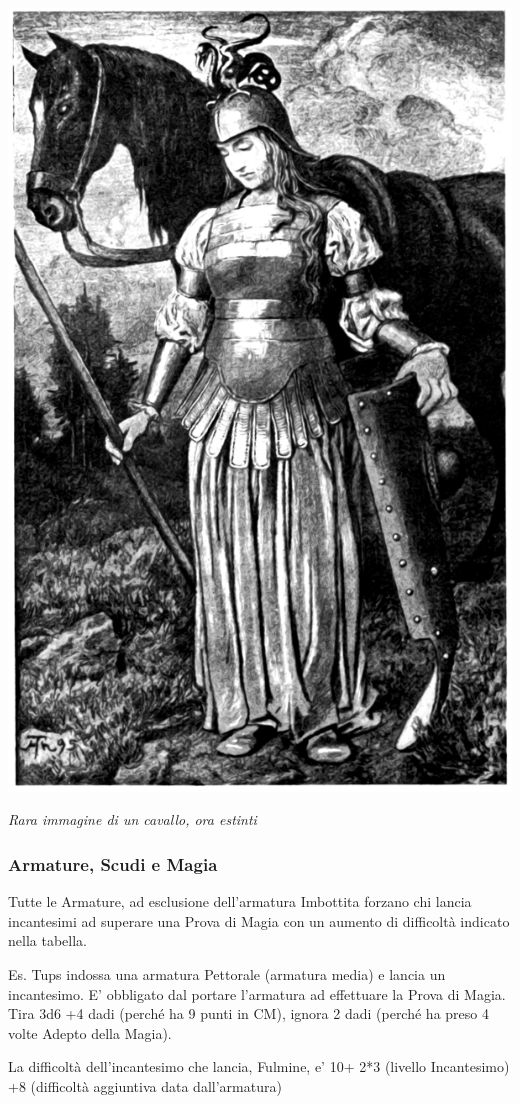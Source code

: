 \begin{multicols}{2}
\begin{center}
	\includegraphics[width=0.75\linewidth]{immagini/donnacavalierecavallo.png}

	\emph{Rara immagine di un cavallo, ora estinti}
\end{center}

\subsubsection{Armature, Scudi e Magia}\hypertarget{armatureemagie}{}\label{armatureemagie}

Tutte le Armature, ad esclusione dell'armatura Imbottita forzano chi lancia incantesimi ad superare una Prova di Magia con un aumento di difficoltà indicato nella tabella.

Es. Tups indossa una armatura Pettorale (armatura media) e lancia un incantesimo. E' obbligato dal portare l'armatura ad effettuare la Prova di Magia. Tira 3d6 +4 dadi (perché ha 9 punti in CM), ignora 2 dadi (perché ha preso 4 volte Adepto della Magia).

La difficoltà dell'incantesimo che lancia, Fulmine, e' 10+ 2*3 (livello Incantesimo) +8 (difficoltà aggiuntiva data dall'armatura)


\end{multicols}
